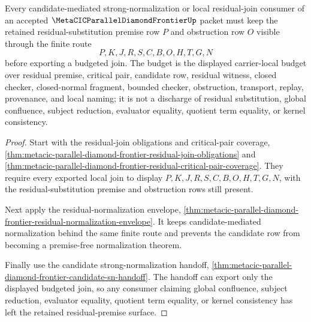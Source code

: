 \begin{theorem}
\label{thm:metacic-parallel-diamond-frontier-residual-premise-budget-scope}
Every candidate-mediated strong-normalization or local residual-join consumer of an accepted $\MetaCICParallelDiamondFrontierUp$ packet must keep the retained residual-substitution premise row $P$ and obstruction row $O$ visible through the finite route
$$
P,K,J,R,S,C,B,O,H,T,G,N
$$
before exporting a budgeted join. The budget is the displayed carrier-local budget over residual premise, critical pair, candidate row, residual witness, closed checker, closed-normal fragment, bounded checker, obstruction, transport, replay, provenance, and local naming; it is not a discharge of residual substitution, global confluence, subject reduction, evaluator equality, quotient term equality, or kernel consistency.
\end{theorem}
\begin{proof}
Start with the residual-join obligations and critical-pair coverage, \autoref{thm:metacic-parallel-diamond-frontier-residual-join-obligations} and \autoref{thm:metacic-parallel-diamond-frontier-residual-critical-pair-coverage}. They require every exported local join to display $P,K,J,R,S,C,B,O,H,T,G,N$, with the residual-substitution premise and obstruction rows still present.

Next apply the residual-normalization envelope, \autoref{thm:metacic-parallel-diamond-frontier-residual-normalization-envelope}. It keeps candidate-mediated normalization behind the same finite route and prevents the candidate row from becoming a premise-free normalization theorem.

Finally use the candidate strong-normalization handoff, \autoref{thm:metacic-parallel-diamond-frontier-candidate-sn-handoff}. The handoff can export only the displayed budgeted join, so any consumer claiming global confluence, subject reduction, evaluator equality, quotient term equality, or kernel consistency has left the retained residual-premise surface.
\end{proof}

